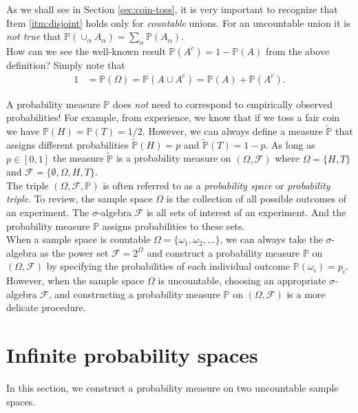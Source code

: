 \documentclass[12pt]{book}
\numberwithin{equation}{chapter}
\theoremstyle{plain}
\numberwithin{theorem}{section}
\theoremstyle{definition}
\numberwithin{exercise}{chapter}
\newcommand{\<}{\langle}
\renewcommand{\>}{\rangle}
\renewcommand{\(}{\left(}
\renewcommand{\)}{\right)}
\renewcommand{\[}{\left[}
\renewcommand{\]}{\right]}
\newcommand\Pb{\mathds{P}}
\newcommand\Fc{\mathscr{F}}
\newcommand\om{\omega}
\newcommand\Om{\Omega}
\newcommand\sig{\sigma}
\newcommand\Pbt{\widetilde{\Pb}}
\newcommand{\blu}[1]{\textcolor{blue}{#1}}
\begin{document}
\noindent
As we shall see in Section \ref{sec:coin-toss}, it is very important to recognize that Item \ref{itm:disjoint} holds only for \emph{countable} unions.  For an uncountable union it is \emph{not true} that $\Pb( \cup_\alpha A_\alpha ) = \sum_\alpha \Pb( A_\alpha )$.
\\[0,5em]
How can we see the well-known result $\Pb( A^c ) = 1 - \Pb( A )$ from the above definition?  Simply note that
\begin{align}
1
	&=	\Pb(\Om) = \Pb( A \cup A^c ) = \Pb( A ) + \Pb( A^c ) .
\end{align}

\noindent
A probability measure $\Pb$ does \emph{not} need to correspond to empirically observed probabilities!  For example, from experience, we know that if we toss a fair coin we have $\Pb( H ) = \Pb( T ) = 1/2$.  However, we can always define a measure $\Pbt$ that assigns different probabilities $\Pbt( H ) = p$ and $\Pbt( T ) = 1-p$.  As long as $p \in [0,1]$ the measure $\Pbt$ is a probability measure on $(\Om,\Fc)$ where $\Om = \{H,T\}$ and $\Fc = \{ \emptyset, \Om, H, T \}$.
\\[0.5em]
The triple $(\Om,\Fc,\Pb)$ is often referred to as a \emph{probability space} or \emph{probability triple}.  To review, the sample space $\Om$ is the collection of all possible outcomes of an experiment.  The $\sig$-algebra $\Fc$ is all sets of interest of an experiment.  And the probability measure $\Pb$ assigns probabilities to these sets.
\\[0.5em]
When a sample space is countable $\Om=\{\om_1, \om_2, \ldots \}$, we can always take the $\sig$-algebra as the power set $\Fc = 2^\Om$ and construct a probability measure $\Pb$ on $(\Om,\Fc)$ by specifying the probabilities of each individual outcome $\Pb(\om_i) = p_i$.  However, when the sample space $\Om$ is uncountable, choosing an appropriate $\sig$-algebra $\Fc$, and constructing a probability measure $\Pb$ on $(\Om,\Fc)$ is a more delicate procedure.


\section{Infinite probability spaces}

In this section, we construct a probability measure on two uncountable sample spaces.
\end{document}
